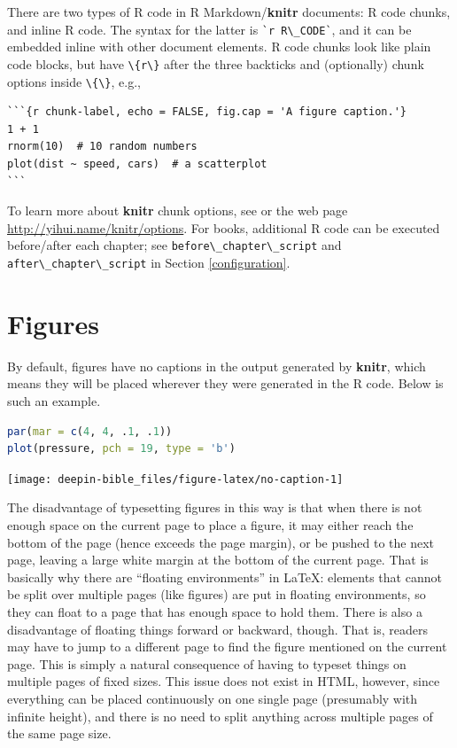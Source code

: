 \documentclass[doctor,openright,twoside]{sjtuthesis}
\newcommand{\passthrough}[1]{#1}
\theoremstyle{plain}
\theoremstyle{definition}
\theoremstyle{remark}
\theoremstyle{ocrenumbox}
\theoremstyle{plain}
\begin{document}
There are two types of R code in R Markdown/\textbf{knitr} documents: R code chunks, and inline R code. The syntax for the latter is \passthrough{\lstinline!`r R\_CODE`!}, and it can be embedded inline with other document elements. R code chunks look like plain code blocks, but have \passthrough{\lstinline!\{r\}!} after the three backticks and (optionally) chunk options inside \passthrough{\lstinline!\{\}!}, e.g.,

\begin{lstlisting}
```{r chunk-label, echo = FALSE, fig.cap = 'A figure caption.'}
1 + 1
rnorm(10)  # 10 random numbers
plot(dist ~ speed, cars)  # a scatterplot
```
\end{lstlisting}

To learn more about \textbf{knitr} chunk options, see \textcite{xie2015} or the web page \url{http://yihui.name/knitr/options}. For books, additional R code can be executed before/after each chapter; see \passthrough{\lstinline!before\_chapter\_script!} and \passthrough{\lstinline!after\_chapter\_script!} in Section \ref{configuration}.

\hypertarget{figures}{%
\section{Figures}\label{figures}}

By default, figures have no captions in the output generated by \textbf{knitr}, which means they will be placed wherever they were generated in the R code. Below is such an example.

\begin{lstlisting}[language=R]
par(mar = c(4, 4, .1, .1))
plot(pressure, pch = 19, type = 'b')
\end{lstlisting}

\texttt{[image: deepin-bible\_files/figure-latex/no-caption-1]}

The disadvantage of typesetting figures in this way is that when there is not enough space on the current page to place a figure, it may either reach the bottom of the page (hence exceeds the page margin), or be pushed to the next page, leaving a large white margin at the bottom of the current page. That is basically why there are ``floating environments'' in LaTeX: elements that cannot be split over multiple pages (like figures) are put in floating environments, so they can float to a page that has enough space to hold them. There is also a disadvantage of floating things forward or backward, though. That is, readers may have to jump to a different page to find the figure mentioned on the current page. This is simply a natural consequence of having to typeset things on multiple pages of fixed sizes. This issue does not exist in HTML, however, since everything can be placed continuously on one single page (presumably with infinite height), and there is no need to split anything across multiple pages of the same page size.
\end{document}
